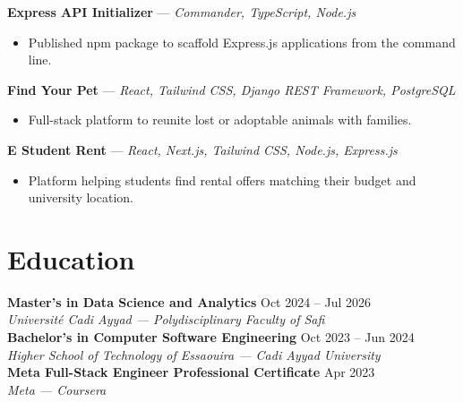 \documentclass[11pt,a4paper]{article}
\begin{document}
\vspace{2pt}
{\small
\textbf{Express API Initializer} --- \textit{Commander, TypeScript, Node.js}}
\begin{itemize}[leftmargin=12pt]
  \item {\small Published npm package to scaffold Express.js applications from the command line.}
\end{itemize}

\vspace{2pt}
{\small
\textbf{Find Your Pet} --- \textit{React, Tailwind CSS, Django REST Framework, PostgreSQL}}
\begin{itemize}[leftmargin=12pt]
  \item {\small Full-stack platform to reunite lost or adoptable animals with families.}
\end{itemize}

\vspace{2pt}
{\small
\textbf{E Student Rent} --- \textit{React, Next.js, Tailwind CSS, Node.js, Express.js}}
\begin{itemize}[leftmargin=12pt]
  \item {\small Platform helping students find rental offers matching their budget and university location.}
\end{itemize}

\section{Education}

{\small
\textbf{Master's in Data Science and Analytics} \hfill Oct 2024 -- Jul 2026 \\
\textit{Universit\'{e} Cadi Ayyad --- Polydisciplinary Faculty of Safi} \\[4pt]
\textbf{Bachelor's in Computer Software Engineering} \hfill Oct 2023 -- Jun 2024 \\
\textit{Higher School of Technology of Essaouira --- Cadi Ayyad University} \\[4pt]
\textbf{Meta Full-Stack Engineer Professional Certificate} \hfill Apr 2023 \\
\textit{Meta --- Coursera} }
\end{document}
